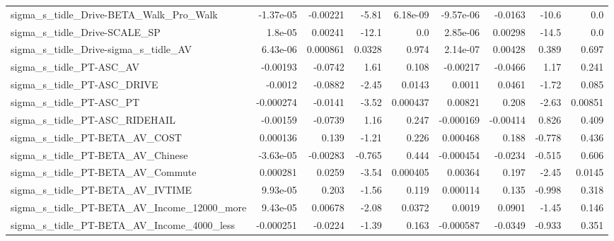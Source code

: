 \begin{tabular}{lrrrrrrrr}
sigma\_s\_tidle\_Drive-BETA\_Walk\_Pro\_Walk             &   -1.37e-05 &     -0.00221 &    -5.81 & 6.18e-09 &  -9.57e-06 &     -0.0163 &        -10.6 &           0.0 \\
sigma\_s\_tidle\_Drive-SCALE\_SP                       &     1.8e-05 &      0.00241 &    -12.1 &      0.0 &   2.85e-06 &     0.00298 &        -14.5 &           0.0 \\
sigma\_s\_tidle\_Drive-sigma\_s\_tidle\_AV               &    6.43e-06 &     0.000861 &   0.0328 &    0.974 &   2.14e-07 &     0.00428 &        0.389 &         0.697 \\
sigma\_s\_tidle\_PT-ASC\_AV                            &    -0.00193 &      -0.0742 &     1.61 &    0.108 &   -0.00217 &     -0.0466 &         1.17 &         0.241 \\
sigma\_s\_tidle\_PT-ASC\_DRIVE                         &     -0.0012 &      -0.0882 &    -2.45 &   0.0143 &     0.0011 &      0.0461 &        -1.72 &         0.085 \\
sigma\_s\_tidle\_PT-ASC\_PT                            &   -0.000274 &      -0.0141 &    -3.52 & 0.000437 &    0.00821 &       0.208 &        -2.63 &       0.00851 \\
sigma\_s\_tidle\_PT-ASC\_RIDEHAIL                      &    -0.00159 &      -0.0739 &     1.16 &    0.247 &  -0.000169 &    -0.00414 &        0.826 &         0.409 \\
sigma\_s\_tidle\_PT-BETA\_AV\_COST                      &    0.000136 &        0.139 &    -1.21 &    0.226 &   0.000468 &       0.188 &       -0.778 &         0.436 \\
sigma\_s\_tidle\_PT-BETA\_AV\_Chinese                   &   -3.63e-05 &     -0.00283 &   -0.765 &    0.444 &  -0.000454 &     -0.0234 &       -0.515 &         0.606 \\
sigma\_s\_tidle\_PT-BETA\_AV\_Commute                   &    0.000281 &       0.0259 &    -3.54 & 0.000405 &    0.00364 &       0.197 &        -2.45 &        0.0145 \\
sigma\_s\_tidle\_PT-BETA\_AV\_IVTIME                    &    9.93e-05 &        0.203 &    -1.56 &    0.119 &   0.000114 &       0.135 &       -0.998 &         0.318 \\
sigma\_s\_tidle\_PT-BETA\_AV\_Income\_12000\_more         &    9.43e-05 &      0.00678 &    -2.08 &   0.0372 &     0.0019 &      0.0901 &        -1.45 &         0.146 \\
sigma\_s\_tidle\_PT-BETA\_AV\_Income\_4000\_less          &   -0.000251 &      -0.0224 &    -1.39 &    0.163 &  -0.000587 &     -0.0349 &       -0.933 &         0.351 \\

\end{tabular}
